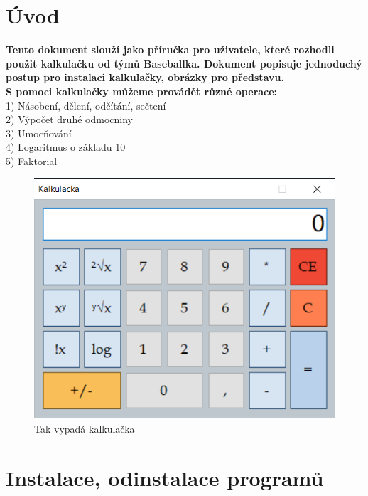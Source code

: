 \documentclass[12pt,a4paper]{article}
\begin{document}
	
	\newpage
	\section*{\LARGE Úvod}
	
	\hspace{1cm}
	\textbf{Tento dokument slouží jako příručka pro uživatele, které rozhodli použit kalkulačku od týmů Baseballka. Dokument popisuje jednoduchý postup pro instalaci kalkulačky, obrázky pro představu.}\\
	 \hspace{1cm} 
	 \textbf{S pomoci kalkulačky můžeme provádět různé operace:} \\
	 1) Násobení, dělení, odčítání, sečtení \\
	 2) Výpočet druhé odmocniny		\\
	 3)	Umocňování	\\
	 4)	Logaritmus o základu 10 \\
	 5) Faktorial	
	
	\begin{figure}[H] 
		\center\includegraphics[width=0.6\linewidth]{pictures/look}
		\caption{Tak vypadá kalkulačka} 
	\end{figure}
	
	\newpage
	
	\section*{\LARGE Instalace, odinstalace programů}
	
\end{document}
